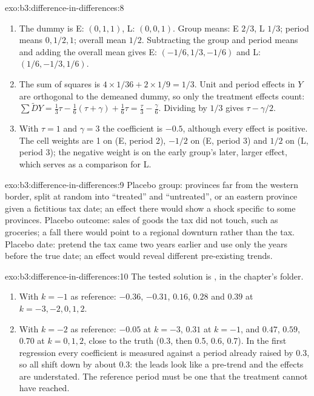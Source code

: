 \begin{solution}{exo:b3:difference-in-differences:8}
\begin{enumerate}
\item The dummy is E: $(0, 1, 1)$, L: $(0, 0, 1)$. Group means: E $2/3$, L
$1/3$; period means $0, 1/2, 1$; overall mean $1/2$. Subtracting the group and
period means and adding the overall mean gives E: $(-1/6, 1/3, -1/6)$ and L:
$(1/6, -1/3, 1/6)$.
\item The sum of squares is $4 \times 1/36 + 2 \times 1/9 = 1/3$. Unit and period
effects in $Y$ are orthogonal to the demeaned dummy, so only the treatment
effects count: $\sum \tilde D Y = \frac13 \tau - \frac16(\tau + \gamma) + \frac16
\tau = \frac{\tau}{3} - \frac{\gamma}{6}$. Dividing by $1/3$ gives $\tau -
\gamma/2$.
\item With $\tau = 1$ and $\gamma = 3$ the coefficient is $-0.5$, although every
effect is positive. The cell weights are 1 on (E, period 2), $-1/2$ on (E,
period 3) and $1/2$ on (L, period 3); the negative weight is on the early
group's later, larger effect, which serves as a comparison for L.
\end{enumerate}
\end{solution}

\begin{solution}{exo:b3:difference-in-differences:9}
Placebo group: provinces far from the western border, split at random into
``treated'' and ``untreated'', or an eastern province given a fictitious tax
date; an effect there would show a shock specific to some provinces. Placebo
outcome: sales of goods the tax did not touch, such as groceries; a fall there
would point to a regional downturn rather than the tax. Placebo date: pretend
the tax came two years earlier and use only the years before the true date; an
effect would reveal different pre-existing trends.
\end{solution}

\begin{solution}{exo:b3:difference-in-differences:10}
The tested solution is , in the chapter's
 folder.
\begin{enumerate}
\item With $k = -1$ as reference: $-0.36$, $-0.31$, $0.16$, $0.28$ and $0.39$ at
$k = -3, -2, 0, 1, 2$. %
\item With $k = -2$ as reference: $-0.05$ at $k = -3$, $0.31$ at $k = -1$, and
$0.47$, $0.59$, $0.70$ at $k = 0, 1, 2$, close to the truth (0.3, then 0.5, 0.6,
0.7). In the first regression every coefficient is measured against a period
already raised by 0.3, so all shift down by about 0.3: the leads look like a
pre-trend and the effects are understated. The reference period must be one that
the treatment cannot have reached.
\end{enumerate}
\end{solution}

